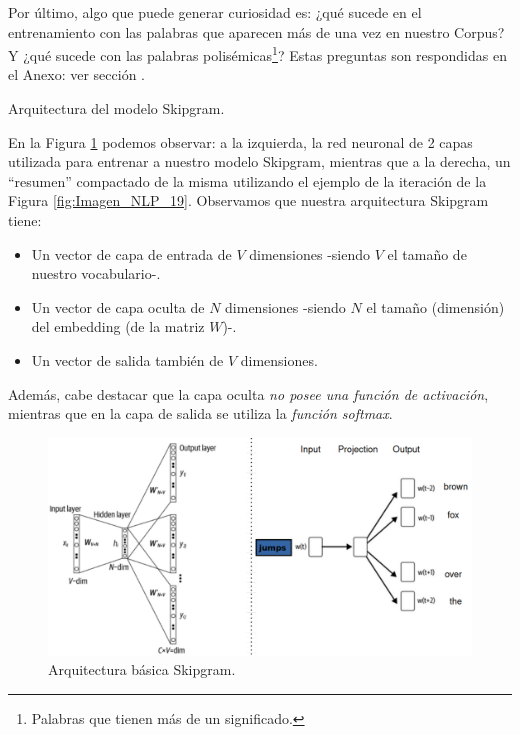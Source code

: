 \documentclass[12pt,a4paper]{article}
\makeatletter
\renewcommand\paragraph{\@startsection{paragraph}{4}{\z@}
            {-2.5ex\@plus -1ex \@minus -.25ex}
            {1.25ex \@plus .25ex}
            {\normalfont\normalsize\bfseries}}
\makeatother
\begin{document}
\begin{sloppypar}
Por último, algo que puede generar curiosidad es: ¿qué sucede en el entrenamiento con las palabras que aparecen más de una vez en nuestro Corpus? Y ¿qué sucede con las palabras polisémicas\footnote{Palabras que tienen más de un significado.}? Estas preguntas son respondidas en el Anexo: ver sección \textit{}.

\cleardoublepage

\paragraph{Arquitectura del modelo Skipgram.}\label{skipgram}

En la Figura \ref{fig:Imagen_NLP_22} podemos observar: a la izquierda, la red neuronal de 2 capas utilizada para entrenar a nuestro modelo Skipgram, mientras que a la derecha, un “resumen” compactado de la misma utilizando el ejemplo de la iteración de la Figura \ref{fig:Imagen_NLP_19}. Observamos que nuestra arquitectura Skipgram tiene:
\begin{itemize}
\item Un vector de capa de entrada de $V$ dimensiones -siendo $V$ el tamaño de nuestro vocabulario-.
\item Un vector de capa oculta de $N$ dimensiones -siendo $N$ el tamaño (dimensión) del embedding (de la matriz $W$)-. 
\item Un vector de salida también de $V$ dimensiones. 
\end{itemize}

Además, cabe destacar que la capa oculta \textit{no posee una función de activación}, mientras que en la capa de salida se utiliza la \textit{función softmax}. 

\begin{figure}[H]    
 \centering
 \includegraphics[width=1\textwidth]{images/NLP/22.png}
 \caption{Arquitectura básica Skipgram\cite{NLP_26}.}
 \label{fig:Imagen_NLP_22}
\end{figure}


\end{sloppypar}
\end{document}

